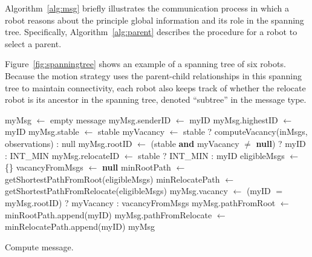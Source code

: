 Algorithm~\ref{alg:msg} briefly illustrates the communication process in which a robot reasons about the principle global information and its role in the spanning tree.
%
Specifically, Algorithm~\ref{alg:parent} describes the procedure for a robot to select a parent. 


Figure~\ref{fig:spanningtree} shows an example of a spanning tree of six robots.
%
Because the motion strategy uses the parent-child relationships in this
spanning tree to maintain connectivity, each robot also keeps track of whether
the relocate robot is its ancestor in the spanning tree, denoted ``subtree'' in
the message type.


\begin{algorithm}
    myMsg $\leftarrow$ empty message\;
    myMsg.senderID $\leftarrow$ myID\;
    myMsg.highestID $\leftarrow$ myID\;
    myMsg.stable $\leftarrow$ stable\;
    myVacancy $\leftarrow$ stable ? computeVacancy(inMsgs, observations) : null\;
    myMsg.rootID $\leftarrow$ (stable \textbf{and} myVacancy $\neq$ \textbf{null}) ? myID : INT\_MIN\;
    myMsg.relocateID $\leftarrow$ stable ? INT\_MIN : myID\;
    eligibleMsgs $\leftarrow$ \{\}\;
    vacancyFromMsgs $\leftarrow$ \textbf{null}\;
    minRootPath $\leftarrow$ getShortestPathFromRoot(eligibleMsgs)\;
    minRelocatePath $\leftarrow$ getShortestPathFromRelocate(eligibleMsgs)\;
    myMsg.vacancy $\leftarrow$ (myID $=$ myMsg.rootID) ? myVacancy : vacancyFromMsgs\;
    myMsg.pathFromRoot $\leftarrow$ minRootPath.append(myID)\;
    myMsg.pathFromRelocate $\leftarrow$ minRelocatePath.append(myID)\;
    \Return myMsg\;
    \caption{Compute message.}
    \label{alg:msg}
\end{algorithm}

